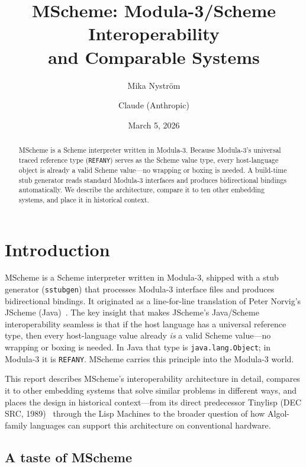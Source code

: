 \documentclass[11pt]{article}
\title{MScheme: Modula-3/Scheme Interoperability\\and Comparable Systems}
\author{Mika Nystr\"om \and Claude (Anthropic)}
\date{March 5, 2026}
\begin{document}
\maketitle

\begin{abstract}
MScheme is a Scheme interpreter written in Modula-3.  Because
Modula-3's universal traced reference type (\texttt{REFANY}) serves
as the Scheme value type, every host-language object is already a
valid Scheme value---no wrapping or boxing is needed.  A build-time
stub generator reads standard Modula-3 interfaces and produces
bidirectional bindings automatically.  We describe the architecture,
compare it to ten other embedding systems, and place it in historical
context.
\end{abstract}

\tableofcontents

\section{Introduction}
\label{sec:intro}

MScheme is a Scheme interpreter written in Modula-3, shipped with a
stub generator (\texttt{sstubgen}) that processes Modula-3 interface
files and produces bidirectional bindings.  It originated as a
line-for-line translation of Peter Norvig's JScheme
(Java)~\cite{norvig1998}.  The key insight that makes JScheme's
Java/Scheme interoperability seamless is that if the host language has
a universal reference type, then every host-language value already
\emph{is} a valid Scheme value---no wrapping or boxing is needed.  In
Java that type is \texttt{java.lang.Object}; in Modula-3 it is
\texttt{REFANY}.  MScheme carries this principle into the Modula-3
world.

This report describes MScheme's interoperability architecture in
detail, compares it to other embedding systems that solve similar
problems in different ways, and places the design in historical
context---from its direct predecessor Tinylisp (DEC SRC,
1989)~\cite{ellis1989} through the Lisp Machines to the broader
question of how Algol-family languages can support this architecture
on conventional hardware.

\subsection*{A taste of MScheme}
\end{document}
